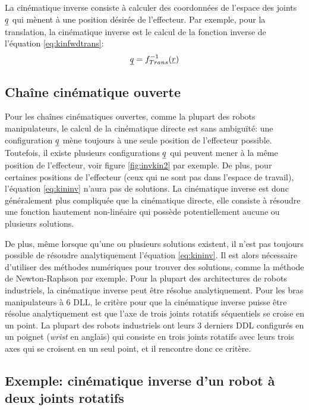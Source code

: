 La cinématique inverse consiste à calculer des coordonnées de l'espace des joints $\underline{q}$ qui mènent à une position désirée de l'effecteur. Par exemple, pour la translation, la cinématique inverse est le calcul de la fonction inverse de l'équation \eqref{eq:kinfwdtrans}:
\begin{align}
\underline{q} = f^{-1}_{Trans}( \underline{r} )
\label{eq:kininv}
\end{align} 


\subsection{Chaîne cinématique ouverte}

Pour les chaînes cinématiques ouvertes, comme la plupart des robots manipulateurs, le calcul de la cinématique directe est sans ambiguïté: une configuration $\underline{q}$ mène toujours à une seule position de l'effecteur possible. Toutefois, il existe plusieurs configurations $\underline{q}$ qui peuvent mener à la même position de l'effecteur, voir figure \ref{fig:invkin2} par exemple. De plus, pour certaines positions de l'effecteur (ceux qui ne sont pas dans l'espace de travail), l'équation \eqref{eq:kininv} n'aura pas de solutions. La cinématique inverse est donc généralement plus compliquée que la cinématique directe, elle consiste à résoudre une fonction hautement non-linéaire qui possède potentiellement aucune ou plusieurs solutions. 

De plus, même lorsque qu'une ou plusieurs solutions existent, il n'est pas toujours possible de résoudre analytiquement l'équation \eqref{eq:kininv}. Il est alors nécessaire d'utiliser des méthodes numériques pour trouver des solutions, comme la méthode de Newton-Raphson par exemple. Pour la plupart des architectures de robots industriels, la cinématique inverse peut être résolue analytiquement. Pour les bras manipulateurs à 6 DLL, le critère pour que la cinématique inverse puisse être résolue analytiquement est que l'axe de trois joints rotatifs séquentiels se croise en un point. La plupart des robots industriels ont leurs 3 derniers DDL configurés en un poignet (\textit{wrist} en anglais) qui consiste en trois joints rotatifs avec leurs trois axes qui se croisent en un seul point, et il rencontre donc ce critère.


\subsection{Exemple: cinématique inverse d'un robot à deux joints rotatifs}

